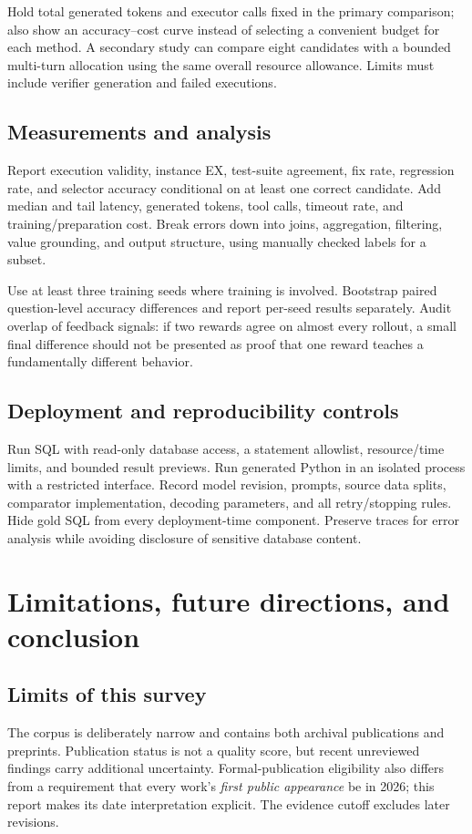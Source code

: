 \documentclass[11pt,a4paper]{article}
\begin{document}
Hold total generated tokens and executor calls fixed in the primary comparison; also show an accuracy--cost curve instead of selecting a convenient budget for each method. A secondary study can compare eight candidates with a bounded multi-turn allocation using the same overall resource allowance. Limits must include verifier generation and failed executions.

\subsection{Measurements and analysis}
Report execution validity, instance EX, test-suite agreement, fix rate, regression rate, and selector accuracy conditional on at least one correct candidate. Add median and tail latency, generated tokens, tool calls, timeout rate, and training/preparation cost. Break errors down into joins, aggregation, filtering, value grounding, and output structure, using manually checked labels for a subset.

Use at least three training seeds where training is involved. Bootstrap paired question-level accuracy differences and report per-seed results separately. Audit overlap of feedback signals: if two rewards agree on almost every rollout, a small final difference should not be presented as proof that one reward teaches a fundamentally different behavior.

\subsection{Deployment and reproducibility controls}
Run SQL with read-only database access, a statement allowlist, resource/time limits, and bounded result previews. Run generated Python in an isolated process with a restricted interface. Record model revision, prompts, source data splits, comparator implementation, decoding parameters, and all retry/stopping rules. Hide gold SQL from every deployment-time component. Preserve traces for error analysis while avoiding disclosure of sensitive database content.

\clearpage
\section{Limitations, future directions, and conclusion}
\subsection{Limits of this survey}
The corpus is deliberately narrow and contains both archival publications and preprints. Publication status is not a quality score, but recent unreviewed findings carry additional uncertainty. Formal-publication eligibility also differs from a requirement that every work's \emph{first public appearance} be in 2026; this report makes its date interpretation explicit. The evidence cutoff excludes later revisions.
\end{document}
